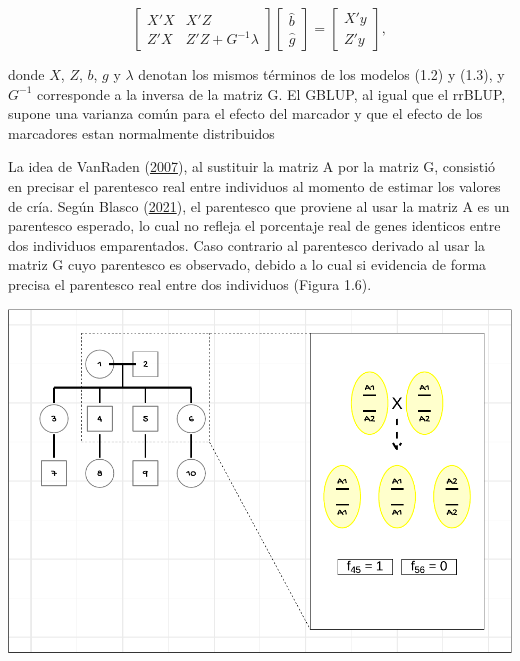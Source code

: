 \documentclass[11pt,spanish,a4paper,oneside,]{book} %
\begin{document}
\begin{equation}
\begin{bmatrix}
X'X & X'Z \\
Z'X & Z'Z + G^{-1} \lambda
\end{bmatrix}
\begin{bmatrix}
\hat{b} \\
\hat{g}
\end{bmatrix}
=
\begin{bmatrix}
X'y \\
Z'y
\end{bmatrix}
,
\end{equation}

donde \(X\), \(Z\), \(b\), \(g\) y \(\lambda\) denotan los mismos términos de los modelos (1.2) y (1.3), y \(G^{-1}\) corresponde a la inversa de la matriz G. El GBLUP, al igual que el rrBLUP, supone una varianza común para el efecto del marcador y que el efecto de los marcadores estan normalmente distribuidos

La idea de VanRaden (\protect\hyperlink{ref-cite:39}{2007}), al sustituir la matriz A por la matriz G, consistió en precisar el parentesco real entre individuos al momento de estimar los valores de cría. Según Blasco (\protect\hyperlink{ref-cite:21}{2021}), el parentesco que proviene al usar la matriz A es un parentesco esperado, lo cual no refleja el porcentaje real de genes identicos entre dos individuos emparentados. Caso contrario al parentesco derivado al usar la matriz G cuyo parentesco es observado, debido a lo cual si evidencia de forma precisa el parentesco real entre dos individuos (Figura 1.6).

\begin{center}\includegraphics[width=1\linewidth]{figures/Ped} \end{center}
\end{document}
